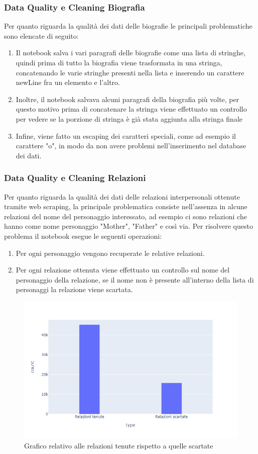 \documentclass[
12pt, %
a4paper, %
oneside, %
headinclude,footinclude, %
BCOR5mm, %
]{scrartcl}
\begin{document}
\subsubsection{Data Quality e Cleaning Biografia}
Per quanto riguarda la qualità dei dati delle biografie le principali problematiche sono elencate di seguito:
\begin{enumerate}
	\item Il notebook salva i vari paragrafi delle biografie come una lista di stringhe, quindi prima di tutto la biografia viene trasformata in una stringa, concatenando le varie stringhe presenti nella lista e inserendo un carattere newLine fra un elemento e l'altro.
	\item Inoltre, il notebook  salvava alcuni paragrafi della biografia più volte, per questo motivo prima di concatenare la stringa viene effettuato un controllo per vedere se la porzione di stringa è già stata aggiunta alla stringa finale
	\item Infine, viene fatto un escaping dei caratteri speciali, come ad esempio il carattere "o", in modo da non avere problemi nell'inserimento nel database dei dati.
\end{enumerate}
\subsubsection{Data Quality e Cleaning Relazioni}
Per quanto riguarda la qualità dei dati delle relazioni interpersonali ottenute tramite web scraping, la principale problematica consiste nell'assenza in alcune relazioni del nome del personaggio interessato, ad esempio ci sono relazioni che hanno come nome personaggio "Mother", "Father" e così via.
Per risolvere questo problema il notebook esegue le seguenti operazioni:
\begin{enumerate}
	\item Per ogni personaggio vengono recuperate le relative relazioni.
	\item Per ogni relazione ottenuta viene effettuato un controllo sul nome del personaggio della relazione, se il nome non è presente all'interno della lista di personaggi la relazione viene scartata.
\end{enumerate}
\begin{figure}[H]
  \includegraphics[scale=0.5]{./Figures/plot_relazioni.png}
  \caption{Grafico relativo alle relazioni tenute rispetto a quelle scartate}
\end{figure}
\end{document}
